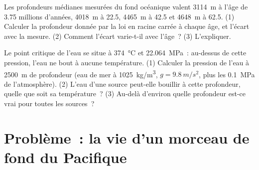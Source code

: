 \begin{exercise}[$\star\star\star$]\label{exo:g11:ocean-ridges:14}
Les profondeurs médianes mesurées du fond océanique valent \qty{3114}{m} à
l'âge de \num{3.75} millions d'années, \qty{4018}{m} à \num{22.5},
\qty{4465}{m} à \num{42.5} et \qty{4648}{m} à \num{62.5}. (1) Calculer la
profondeur donnée par la loi en racine carrée à chaque âge, et l'écart avec
la mesure. (2) Comment l'écart varie-t-il avec l'âge~? (3) L'expliquer.
\end{exercise}

\begin{exercise}[$\star\star\star$]\label{exo:g11:ocean-ridges:15}
Le point critique de l'eau se situe à \qty{374}{\celsius} et
\qty{22.064}{MPa}~: au-dessus de cette pression, l'eau ne bout à aucune
température. (1) Calculer la pression de l'eau à \qty{2500}{m} de
profondeur (eau de mer à \qty{1025}{kg/m^3}, $g = \qty{9.8}{m/s^2}$, plus
les \qty{0.1}{MPa} de l'atmosphère). (2) L'eau d'une source peut-elle
bouillir à cette profondeur, quelle que soit sa température~? (3) Au-delà
d'environ quelle profondeur est-ce vrai pour toutes les sources~?
\end{exercise}

\section{Problème~: la vie d'un morceau de fond du Pacifique}

